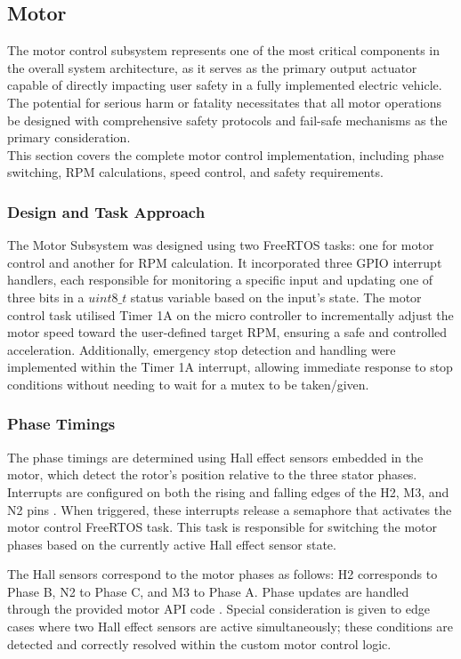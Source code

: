 \documentclass[a4paper, 11pt, titlepage]{article}
\begin{document}
\subsection{Motor}
The motor control subsystem represents one of the most critical components in the overall system architecture, as it serves as the primary output actuator capable of directly impacting user safety in a fully implemented electric vehicle. The potential for serious harm or fatality necessitates that all motor operations be designed with comprehensive safety protocols and fail-safe mechanisms as the primary consideration.\\
This section covers the complete motor control implementation, including phase switching, RPM calculations, speed control, and safety requirements.
\subsubsection{Design and Task Approach}
The Motor Subsystem was designed using two FreeRTOS tasks: one for motor control and another for RPM calculation. It incorporated three GPIO interrupt handlers, each responsible for monitoring a specific input and updating one of three bits in a $uint8\_t$ status variable based on the input’s state. The motor control task utilised Timer 1A \parencite{tm4c129ncpdt} on the micro controller to incrementally adjust the motor speed toward the user-defined target RPM, ensuring a safe and controlled acceleration. Additionally, emergency stop detection and handling were implemented within the Timer 1A interrupt, allowing immediate response to stop conditions without needing to wait for a mutex to be taken/given.
\subsubsection{Phase Timings}
The phase timings are determined using Hall effect sensors embedded in the motor, which detect the rotor's position relative to the three stator phases. Interrupts are configured on both the rising and falling edges of the H2, M3, and N2 pins \parencite{egh456support}. When triggered, these interrupts release a semaphore that activates the motor control FreeRTOS task. This task is responsible for switching the motor phases based on the currently active Hall effect sensor state.

The Hall sensors correspond to the motor phases as follows: H2 corresponds to Phase B, N2 to Phase C, and M3 to Phase A. Phase updates are handled through the provided motor API code \parencite{egh456support, drv8323}. Special consideration is given to edge cases where two Hall effect sensors are active simultaneously; these conditions are detected and correctly resolved within the custom motor control logic.
\end{document}
